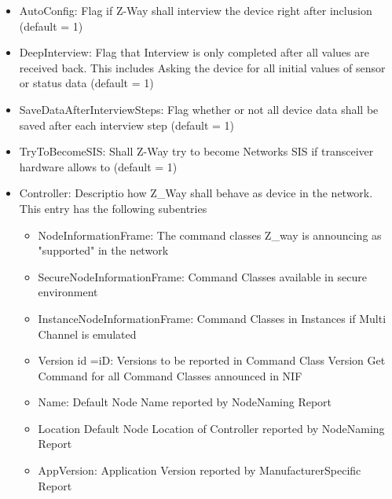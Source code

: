 \begin{itemize}
\item AutoConfig: Flag if Z-Way shall interview the device right after inclusion (default = 1)
\item DeepInterview: Flag that Interview is only completed after all values are received back. This includes
Asking the device for all initial values of sensor or status data (default = 1)
\item SaveDataAfterInterviewSteps: Flag whether or not all device data shall be saved after each interview step (default = 1)
\item TryToBecomeSIS: Shall Z-Way try to become Networks SIS if transceiver hardware allows to (default = 1)
\item Controller: Descriptio how Z_Way shall behave as device in the network. This entry has the following subentries
\begin{itemize}
\item NodeInformationFrame: The command classes Z_way is announcing as "supported" in the network
\item SecureNodeInformationFrame: Command Classes available in secure environment
\item InstanceNodeInformationFrame: Command Classes in Instances if Multi Channel is emulated
\item Version id =iD: Versions to be reported in Command Class Version Get Command for all Command Classes announced in NIF
\item Name: Default Node Name reported by NodeNaming Report
\item Location Default Node Location of Controller reported by NodeNaming Report
\item AppVersion: Application Version reported by ManufacturerSpecific Report 


\end{itemize}
\end{itemize}
